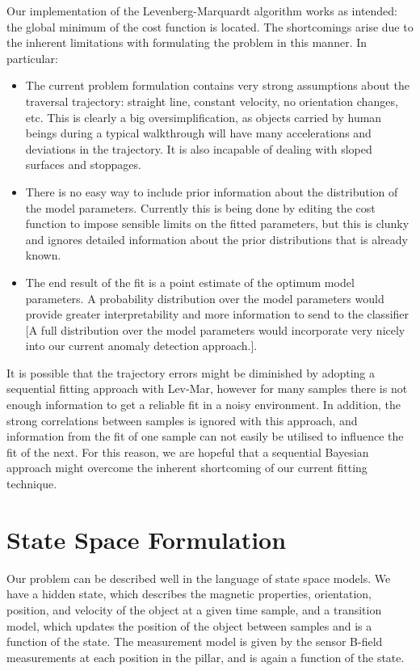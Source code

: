 \documentclass[10pt, a4paper, twocolumn]{article} %
\begin{document}
Our implementation of the Levenberg-Marquardt algorithm works as intended: the global minimum of the cost function is located. The shortcomings arise due to the inherent limitations with formulating the problem in this manner. In particular:

\begin{itemize}
	\item The current problem formulation contains very strong assumptions about the traversal trajectory: straight line, constant velocity, no orientation changes, etc. This is clearly a big oversimplification, as objects carried by human beings during a typical walkthrough will have many accelerations and deviations in the trajectory. It is also incapable of dealing with sloped surfaces and stoppages.
	
	\item There is no easy way to include prior information about the distribution of the model parameters. Currently this is being done by editing the cost function to impose sensible limits on the fitted parameters, but this is clunky and ignores detailed information about the  prior distributions that is already known.
	
	\item The end result of the fit is a point estimate of the optimum model parameters. A probability distribution over the model parameters would provide greater interpretability and more information to send to the classifier [A full distribution over the model parameters would incorporate very nicely into our current anomaly detection approach.].
\end{itemize}

It is possible that the trajectory errors might be diminished by adopting a sequential fitting approach with Lev-Mar, however for many samples there is not enough information to get a reliable fit in a noisy environment. In addition, the strong correlations between samples is ignored with this approach, and information from the fit of one sample can not easily be utilised to influence the fit of the next. For this reason, we are hopeful that a sequential Bayesian approach might overcome the inherent shortcoming of our current fitting technique.

\section{State Space Formulation}

Our problem can be described well in the language of state space models. We have a hidden state, which describes the magnetic properties, orientation, position, and velocity of the object at a given time sample, and a transition model, which updates the position of the object between samples and is a function of the state. The measurement model is given by the sensor B-field measurements at each position in the pillar, and is again a function of the state.
\end{document}
